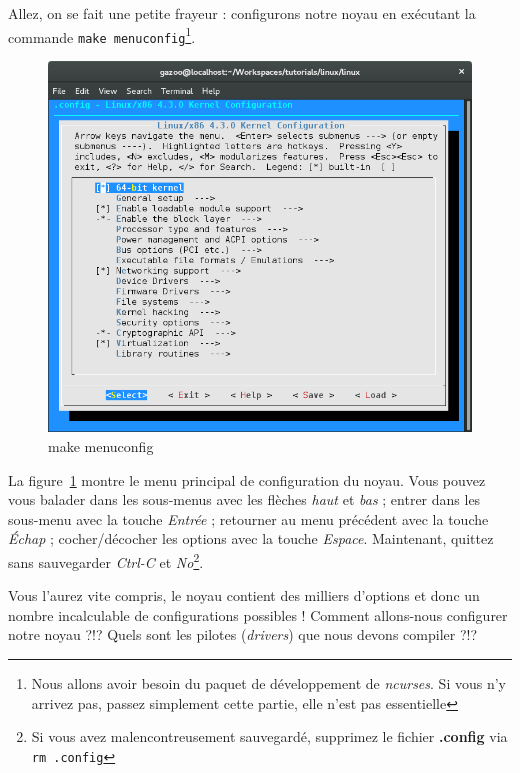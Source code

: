 \documentclass[a4paper]{article}
\begin{document}
Allez, on se fait une petite frayeur : configurons notre noyau en exécutant la commande \lstinline{make menuconfig}\footnote{Nous allons avoir besoin du paquet de développement de \textit{ncurses}. Si vous n'y arrivez pas, passez simplement cette partie, elle n'est pas essentielle}.
\bigskip

\begin{figure}
\includegraphics[width=\textwidth,height=\textheight,keepaspectratio]{../res/make-menuconfig.png}
\caption{make menuconfig}
\label{fig:make_menuconfig}
\end{figure}

La figure~\ref{fig:make_menuconfig} montre le menu principal de configuration du noyau. Vous pouvez vous balader dans les sous-menus avec les flèches \textit{haut} et \textit{bas} ; entrer dans les sous-menu avec la touche \textit{Entrée} ; retourner au menu précédent avec la touche \textit{Échap} ; cocher/décocher les options avec la touche \textit{Espace}. Maintenant, quittez sans sauvegarder \textit{Ctrl-C} et \textit{No}\footnote{Si vous avez malencontreusement sauvegardé, supprimez le fichier \textbf{.config} via \lstset{language=sh}\lstinline{rm .config}}.
\bigskip

Vous l'aurez vite compris, le noyau contient des milliers d'options et donc un nombre incalculable de configurations possibles ! Comment allons-nous configurer notre noyau ?!? Quels sont les pilotes (\textit{drivers}) que nous devons compiler ?!?
\end{document}
